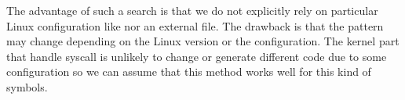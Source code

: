 The advantage of such a search is that we do not explicitly rely on particular
Linux configuration like  nor an external file. The
drawback is that the pattern may change depending on the Linux version or the
configuration. The kernel part that handle syscall is unlikely to change or
generate different code due to some configuration so we can assume that this
method works well for this kind of symbols.
